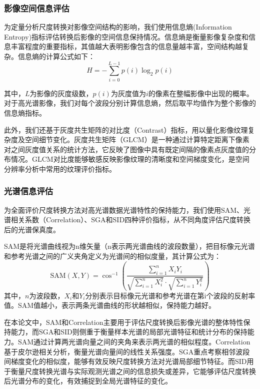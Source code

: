 \subsubsection{影像空间信息评估}
为定量分析尺度转换对影像空间结构的影响，我们使用信息熵(Information Entropy)指标评估转换后影像的空间信息保持情况。信息熵是衡量影像复杂度和信息丰富程度的重要指标，其值越大表明影像包含的信息量越丰富，空间结构越复杂\cite{song2019class}。信息熵的计算公式如下：
\begin{equation}
H = -\sum_{i=0}^{L-1} p(i) \log_2 p(i)
\label{eq:entropy}
\end{equation}

其中，$L$为影像的灰度级数，$p(i)$为灰度值为$i$的像素在整幅影像中出现的概率。对于高光谱影像，我们对每个波段分别计算信息熵，然后取平均值作为整个影像的信息熵指标。

此外，我们还基于灰度共生矩阵的对比度（Contrast）指标，用以量化影像纹理复杂度及空间细节变化。灰度共生矩阵（GLCM）是一种通过计算特定距离下像素对之间灰度值关系的统计方法，它反映了图像中具有既定间隔的像素点灰度值的分布情况\cite{wan2022detection}。GLCM对比度能够敏感反映影像纹理的清晰度和空间梯度变化，是空间分辨率分析中常用的纹理评价指标。
\subsubsection{光谱信息评估}
为全面评价尺度转换方法对高光谱数据光谱特性的保持能力，我们使用SAM、光谱相关系数（Correlation）、SGA和SID四种评价指标，从不同角度评估尺度转换后的光谱保真度。

SAM是将光谱曲线视为n维矢量（n表示两光谱曲线的波段数量），把目标像元光谱和参考光谱之间的广义夹角定义为光谱间的相似度量，其计算公式为：
\begin{equation}
\mathrm{SAM}(X,Y) = \cos^{-1}\left( \frac{\sum_{i=1}^{n} X_i Y_i}{\sqrt{\sum_{i=1}^{n} X_i^2} \cdot \sqrt{\sum_{i=1}^{n} Y_i^2}} \right)
\label{eq:SAM}
\end{equation}
其中，$n$为波段数，$X_i$和$Y_i$分别表示目标像元光谱和参考光谱在第i个波段的反射率值。SAM值越小，表示两条光谱曲线的形状越相似，保持能力越好。

在本论文中，SAM和Correlation主要用于评估尺度转换后影像光谱的整体特性保持能力，而SGA和SID则侧重于衡量样本光谱的局部光谱特征和统计分布的保持能力。SAM通过计算两光谱向量之间的夹角\cite{padma2014jeffries}来表示两光谱的相似程度\cite{chakravarty2021hyperspectral}。Correlation基于皮尔逊相关分析\cite{de2000spectral}，衡量光谱向量间的线性关系强度。SGA\cite{robila2005investigation}重点考察相邻波段间梯度变化的相似度，能够有效反映尺度转换方法对光谱局部细节特征。而SID\cite{chang1999spectral}用于衡量尺度转换光谱与实际观测光谱之间的信息损失或差异，它能够评估尺度转换后光谱分布的变化，有效捕捉到全局光谱特征的变化。
